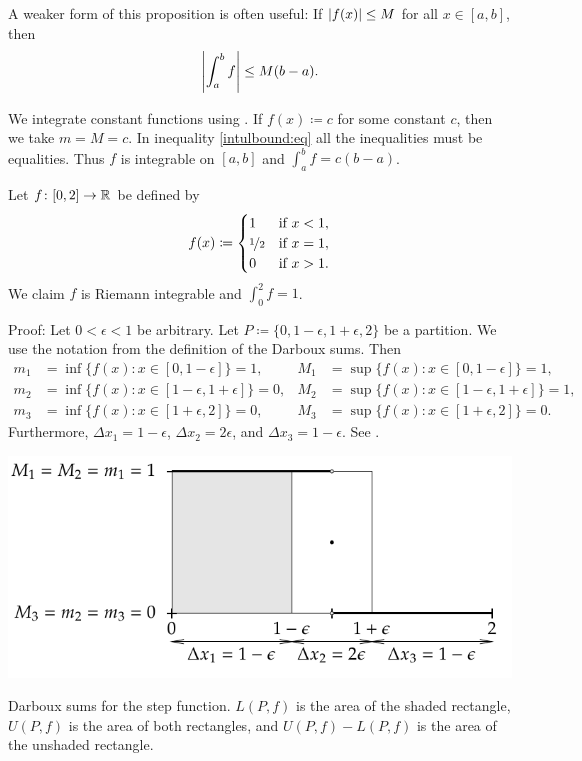 A weaker form of this proposition is often useful:
If $\left\lvert {f(x)} \right\rvert \leq M$ for all $x \in [a,b]$, then
\begin{equation*}
\left\lvert {\int_a^b f} \right\rvert \leq M(b-a) .
\end{equation*}

\begin{example}
We integrate constant functions using
.
If $f(x) \coloneqq c$ for some constant $c$, then we take $m = M = c$.
In inequality \eqref{intulbound:eq}
all the inequalities must be equalities.
Thus $f$ is integrable on $[a,b]$ and $\int_a^b f = c(b-a)$.
\end{example}

\begin{example}
Let $f \colon [0,2] \to {\mathbb{R}}$ be defined by
\begin{equation*}
f(x) \coloneqq
\begin{cases}
1               & \text{if } x < 1,\\
\nicefrac{1}{2} & \text{if } x = 1,\\
0               & \text{if } x > 1.
\end{cases}
\end{equation*}
We claim $f$ is Riemann integrable and $\int_0^2 f = 1$.

Proof: Let $0 < \epsilon < 1$ be arbitrary.
Let $P \coloneqq \{0, 1-\epsilon, 1+\epsilon, 2\}$ be a partition.  We use the notation from
the definition of the Darboux sums.  Then
\begin{align*}
m_1 &= \inf  \bigl\{ f(x) : x \in [0,1-\epsilon] \bigr\} = 1 , & 
M_1 &= \sup  \bigl\{ f(x) : x \in [0,1-\epsilon] \bigr\} = 1 , \\
m_2 &= \inf  \bigl\{ f(x) : x \in [1-\epsilon,1+\epsilon] \bigr\} = 0 , & 
M_2 &= \sup  \bigl\{ f(x) : x \in [1-\epsilon,1+\epsilon] \bigr\} = 1 , \\
m_3 &= \inf  \bigl\{ f(x) : x \in [1+\epsilon,2] \bigr\} = 0 , & 
M_3 &= \sup  \bigl\{ f(x) : x \in [1+\epsilon,2] \bigr\} = 0 .
\end{align*}
Furthermore, $\Delta x_1 = 1-\epsilon$, $\Delta x_2 = 2\epsilon$, and
$\Delta x_3 = 1-\epsilon$.
See .
\begin{myfigureht}
\includegraphics{figures/darbouxfigstep}
\caption{Darboux sums for the step function.  $L(P,f)$ is the area of the
shaded rectangle, $U(P,f)$ is the area of both rectangles, and
$U(P,f)-L(P,f)$ is the area of the unshaded rectangle.\label{darbouxfigstep}}
\end{myfigureht}


\end{example}
